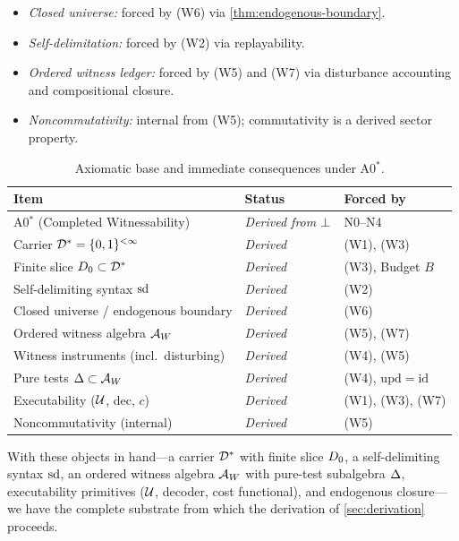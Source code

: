 \begin{itemize}[nosep]
  \item \emph{Closed universe:} forced by (W6) via
        \cref{thm:endogenous-boundary}.
  \item \emph{Self-delimitation:} forced by (W2) via replayability.
  \item \emph{Ordered witness ledger:} forced by (W5) and (W7) via
        disturbance accounting and compositional closure.
  \item \emph{Noncommutativity:} internal from (W5); commutativity is a
        derived sector property.
\end{itemize}

\begin{table}[ht]
\centering
\caption{Axiomatic base and immediate consequences under A0$^*$.}
\label{tab:axiom-summary}
\begin{tabular}{@{}lll@{}}
\toprule
\textbf{Item} & \textbf{Status} & \textbf{Forced by} \\
\midrule
A0$^*$ (Completed Witnessability) & \emph{Derived from $\bot$} & N0--N4 \\
\midrule
Carrier $\mathcal{D}^* = \{0,1\}^{<\infty}$ & \emph{Derived} & (W1), (W3) \\
Finite slice $D_0 \subset \mathcal{D}^*$ & \emph{Derived} & (W3), Budget $B$ \\
Self-delimiting syntax $\mathrm{sd}$ & \emph{Derived} & (W2) \\
Closed universe / endogenous boundary & \emph{Derived} & (W6) \\
Ordered witness algebra $\mathcal{A}_W$ & \emph{Derived} & (W5), (W7) \\
Witness instruments (incl.\ disturbing) & \emph{Derived} & (W4), (W5) \\
Pure tests $\Delta \subset \mathcal{A}_W$ & \emph{Derived} & (W4), $\mathrm{upd} = \mathrm{id}$ \\
Executability ($\mathcal{U}$, dec, $c$) & \emph{Derived} & (W1), (W3), (W7) \\
Noncommutativity (internal) & \emph{Derived} & (W5) \\
\bottomrule
\end{tabular}
\end{table}

With these objects in hand---a carrier $\mathcal{D}^*$ with finite slice
$D_0$, a self-delimiting syntax $\mathrm{sd}$, an ordered witness algebra
$\mathcal{A}_W$ with pure-test subalgebra $\Delta$, executability primitives
($\mathcal{U}$, decoder, cost functional), and endogenous closure---we have the
complete substrate from which the derivation of \cref{sec:derivation}
proceeds.


